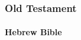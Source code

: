 	\subsubsection{Old Testament} %
	
	
			
			
		\paragraph{Hebrew Bible}
			\label{URIMTHUMMIM-HEBREW}
		
			\subparagraph{\texorpdfstring{}{}} %
				\label{URIM} %
			
